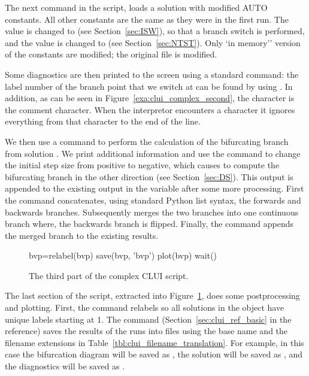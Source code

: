 \documentclass[12pt]{report}
\begin{document}
 The next command in the script,
 loads a solution with modified AUTO constants. All other constants are
 the same as they were in the first run.
 The  value is changed to  (see
 Section~\ref{sec:ISW}), so that a branch switch is performed, and
 the  value is changed to  (see
 Section~\ref{sec:NTST}).
 Only `in memory'' version of the \AUTO constants are modified;
 the original file  is  modified.

 Some diagnostics are then printed to the screen using a standard \python
  command: the label number of the branch point that
 we switch at can be found by using .
 In addition, as can be seen in Figure~\ref{exa:clui_complex_second},
 the \commandf{\#} character is the \python comment character.
 When the \python interpretor encounters a \commandf{\#} character
 it ignores everything from that character to the end of the line.

 We then use a  command to perform the
 calculation of the bifurcating branch from solution .
 We print additional information and use the command
   to change the
 \AUTO initial step size from positive to negative, which causes
 \AUTO to compute the bifurcating branch in the other direction
 (see Section~\ref{sec:DS}).
 This output is appended to the existing output in the
 \python variable  after some more processing.
 First the command
  concatenates, using standard Python list
 syntax, the forwards and backwards branches. Subsequently
  merges the two branches into one
 continuous branch where, the backwards branch is flipped.
 Finally, the command  appends the
 merged branch to the existing results.

 \begin{figure}[htbp]
 {\small \begin{center} \begin{boxedverbatim}
 bvp=relabel(bvp)
 save(bvp, 'bvp')
 plot(bvp)
 wait()
 \end{boxedverbatim}
 \end{center} 
 }
 \caption[The third part of the  complex \AUTO CLUI script.]
 {The third part of the  complex \AUTO CLUI script.}
 \label{exa:clui_complex_third}
 \end{figure}

 The last section of the script, extracted into 
 Figure~\ref{exa:clui_complex_third}, 
 does some postprocessing and
 plotting. First, the command  relabels
 so all solutions in the  object have unique labels
 starting at 1. The command 
 (Section~\ref{sec:clui_ref_basic} in the reference)
 saves the results of the \AUTO runs into files using
 the base name  and the filename extensions in
 Table~\ref{tbl:clui_filename_translation}.  For example,
 in this case the bifurcation diagram will be saved as , 
 the solution will be saved as , and  
 the diagnostics will be saved as .
\end{document}
